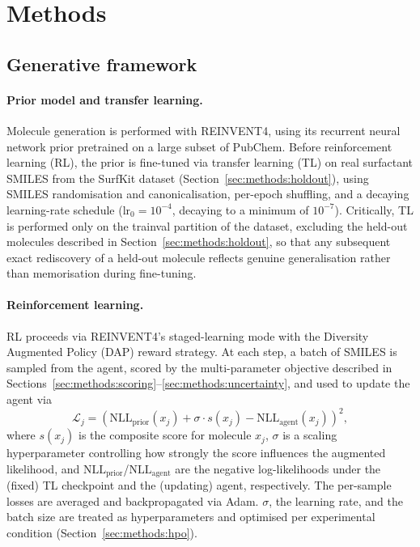 \documentclass[11pt]{aime}
\begin{document}
\section{Methods}
\label{sec:methods}

\subsection{Generative framework}
\label{sec:methods:generative}

\paragraph{Prior model and transfer learning.}
Molecule generation is performed with REINVENT4\cite{loeffler_reinvent_2024}, using its recurrent neural network prior pretrained on a large subset of PubChem\cite{kim_pubchem_2023}.
Before reinforcement learning (RL), the prior is fine-tuned via transfer learning (TL) on real surfactant SMILES from the SurfKit dataset\cite{beckmann_surfkit_2026} (Section~\ref{sec:methods:holdout}), using SMILES randomisation\cite{bjerrum_smiles_2017} and canonicalisation, per-epoch shuffling, and a decaying learning-rate schedule ($\mathrm{lr}_0=10^{-4}$, decaying to a minimum of $10^{-7}$).
Critically, TL is performed only on the trainval partition of the dataset, excluding the held-out molecules described in Section~\ref{sec:methods:holdout}, so that any subsequent exact rediscovery of a held-out molecule reflects genuine generalisation rather than memorisation during fine-tuning.

\paragraph{Reinforcement learning.}
RL proceeds via REINVENT4's staged-learning mode with the Diversity Augmented Policy (DAP) reward strategy.
At each step, a batch of SMILES is sampled from the agent, scored by the multi-parameter objective described in Sections~\ref{sec:methods:scoring}--\ref{sec:methods:uncertainty}, and used to update the agent via
\begin{equation}
    \mathcal{L}_j = \left(\mathrm{NLL}_\mathrm{prior}(x_j) + \sigma \cdot s(x_j) - \mathrm{NLL}_\mathrm{agent}(x_j)\right)^2,
    \label{eq:dap-loss}
\end{equation}
where $s(x_j)$ is the composite score for molecule $x_j$, $\sigma$ is a scaling hyperparameter controlling how strongly the score influences the augmented likelihood, and $\mathrm{NLL}_\mathrm{prior}$/$\mathrm{NLL}_\mathrm{agent}$ are the negative log-likelihoods under the (fixed) TL checkpoint and the (updating) agent, respectively.
The per-sample losses are averaged and backpropagated via Adam\cite{kingma_adam_2015}.
$\sigma$, the learning rate, and the batch size are treated as hyperparameters and optimised per experimental condition (Section~\ref{sec:methods:hpo}).
\end{document}
